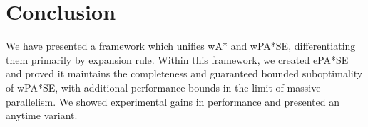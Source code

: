 \documentclass[letterpaper]{article}
\newtheorem{cor}{Corollary}
\begin{document}

\section{Conclusion}

We have presented a framework which unifies wA* and wPA*SE, differentiating them primarily by expansion rule. Within this framework, we created ePA*SE and proved it maintains the completeness and guaranteed bounded suboptimality of wPA*SE, with additional performance bounds in the limit of massive parallelism. We showed experimental gains in performance and presented an anytime variant.

\end{document}
